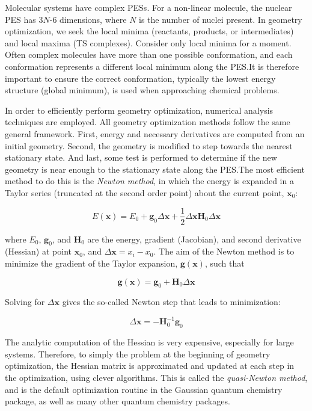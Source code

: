 Molecular systems have complex PESs. For a non-linear molecule, the nuclear PES has 3$N$-6 dimensions, where $N$ is the number of nuclei present.\cite{Heidrich1991} In geometry optimization, we seek the local minima (reactants, products, or intermediates) and local maxima (TS complexes). Consider only local minima for a moment. Often complex molecules have more than one possible conformation, and each conformation represents a different local minimum along the PES.\@ It is therefore important to ensure the correct conformation, typically the lowest energy structure (global minimum), is used when approaching chemical problems.

In order to efficiently perform geometry optimization, numerical analysis techniques are employed. All geometry optimization methods follow the same general framework.\cite{Hratchian2005} First, energy and necessary derivatives are computed from an initial geometry. Second, the geometry is modified to step towards the nearest stationary state. And last, some test is performed to determine if the new geometry is near enough to the stationary state along the PES.\@ The most efficient method to do this is the \emph{Newton method}, in which the energy is expanded in a Taylor series (truncated at the second order point) about the current point, $\mathbf{x}_0$:

\begin{equation}
  E(\mathbf{x}) = E_0 + \mathbf{g}_0\Delta\mathbf{x} + \frac{1}{2}\Delta\mathbf{x}\mathbf{H}_0\Delta \mathbf{x}
\end{equation}

\noindent where $E_0$, $\mathbf{g}_0$, and $\mathbf{H}_0$ are the energy, gradient (Jacobian), and second derivative (Hessian) at point $\mathbf{x}_0$, and $\Delta \mathbf{x} = x_i - x_0$. The aim of the Newton method is to minimize the gradient of the Taylor expansion, $\mathbf{g(x)}$, such that

\begin{equation}
  \mathbf{g(x)} = \mathbf{g}_0 + \mathbf{H}_0 \Delta \mathbf{x}
\end{equation}

\noindent Solving for $\Delta \mathbf{x}$ gives the so-called Newton step that leads to minimization:

\begin{equation}
  \Delta \mathbf{x} = -\mathbf{H}^{-1}_0\mathbf{g}_0
\end{equation}

The analytic computation of the Hessian is very expensive, especially for large systems. Therefore, to simply the problem at the beginning of geometry optimization, the Hessian matrix is approximated and updated at each step in the optimization, using clever algorithms.\cite{Hratchian2005} This is called the \emph{quasi-Newton method}, and is the default optimization routine in the Gaussian\cite{Frisch2009} quantum chemistry package, as well as many other quantum chemistry packages.


